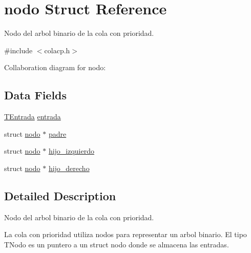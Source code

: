 \hypertarget{structnodo}{\section{nodo Struct Reference}
\label{structnodo}
}


Nodo del arbol binario de la cola con prioridad.  




{\ttfamily \#include $<$colacp.\+h$>$}



Collaboration diagram for nodo\+:
\subsection*{Data Fields}
\begin{DoxyCompactItemize}
\item 
\hyperlink{colacp_8h_ad68b19b2fd7a87dd871dc67b308824df}{T\+Entrada} \hyperlink{structnodo_a6f1aad5bb142f067c93fe4b62ac8eb5b}{entrada}
\item 
struct \hyperlink{structnodo}{nodo} $\ast$ \hyperlink{structnodo_ade731255c7e9f0a7f4515a4d45f9fd7b}{padre}
\item 
struct \hyperlink{structnodo}{nodo} $\ast$ \hyperlink{structnodo_afa64cf5f8a5d1df0ff495e7e915f0b67}{hijo\+\_\+izquierdo}
\item 
struct \hyperlink{structnodo}{nodo} $\ast$ \hyperlink{structnodo_af130c51b632b654403d8e49366918f9f}{hijo\+\_\+derecho}
\end{DoxyCompactItemize}


\subsection{Detailed Description}
Nodo del arbol binario de la cola con prioridad. 

La cola con prioridad utiliza nodos para representar un arbol binario. El tipo T\+Nodo es un puntero a un struct nodo donde se almacena las entradas. 

